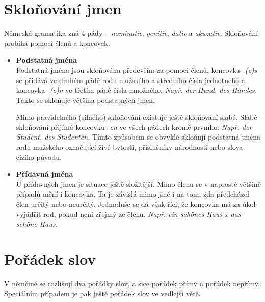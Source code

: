 \documentclass[12pt,a4paper]{report}
\begin{document}
\section{Skloňování jmen}
Německá gramatika zná 4 pády -- \textit{nominativ}, \textit{genitiv}, \textit{dativ} a \textit{akuzativ}. Skloňování probíhá pomocí členů a koncovek. 
\begin{itemize}
\item
\textbf{Podstatná jména}\\
Podstatná jména jsou skloňována především za pomoci členů, koncovka \textit{-(e)s} se přidává ve druhém pádě rodu mužského a středního čísla jednotného a koncovka \textit{-(e)n} ve třetím pádě čísla množného. \textit{Např. der Hund, des Hundes.} Takto se skloňuje většina podstatných jmen.

Mimo pravidelného (silného) skloňování existuje ještě skloňování slabé. Slabé skloňování přijímá koncovku \textit{-en} ve všech pádech kromě prvního. \textit{Např. der Student, des Studenten.} Tímto způsobem se obvykle skloňují podstatná jména rodu mužského označující živé bytosti, příslušníky národností nebo slova cizího původu.

\item
\textbf{Přídavná jména}\\
U přídavných jmen je situace ještě složitější. Mimo členu se v naprosté většině případů mění i koncovka. Ta je závislá mimo jiné i na tom, zda předcházel člen určitý nebo neurčitý. Jednoduše se dá však říci, že koncovka má za úkol vyjádřit rod, pokud není zřejmý ze členu. \textit{Např. ein schönes Haus x das schöne Haus.}
\end{itemize}

\section{Pořádek slov}
V němčině se rozlišují dva pořádky slov, a sice pořádek přímý a pořádek nepřímý. Speciálním případem je pak ještě pořádek slov ve vedlejší větě.
\end{document}
